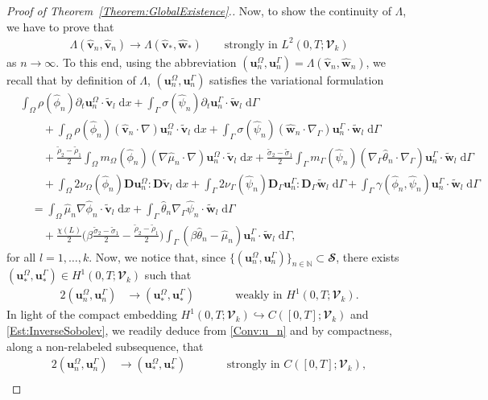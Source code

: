 \documentclass[10pt,reqno]{amsart}
\theoremstyle{remark}
\numberwithin{equation}{section}
\newcommand{\N}{\mathbb N}
\newcommand{\bv}{\mathbf{v}}
\newcommand{\bu}{\mathbf{u}}
\newcommand{\bw}{\mathbf{w}}
\newcommand{\ww}{\widehat{\bw}}
\newcommand{\wv}{\widehat{\bv}}
\newcommand{\tv}{\widetilde{\bv}}
\newcommand{\tw}{\widetilde{\bw}}
\newcommand{\wphi}{\widehat{\phi}}
\newcommand{\wpsi}{\widehat{\psi}}
\newcommand{\wmu}{\widehat{\mu}}
\newcommand{\wtheta}{\widehat{\theta}}
\newcommand{\D}{\mathbf{D}}
\newcommand{\Dg}{\mathbf{D}_\Gamma}
\newcommand{\intO}{\int_\Omega}
\newcommand{\intG}{\int_\Gamma}
\newcommand{\dx}{\;\mathrm{d}x}
\newcommand{\dG}{\;\mathrm d\Ga}
\newcommand{\delt}{\partial_{t}}
\newcommand{\Grad}{\nabla}
\newcommand{\Gradg}{\nabla_\Ga}
\newcommand{\emb}{\hookrightarrow}
\newcommand{\Om}{\Omega}
\newcommand{\Ga}{\Gamma}
\begin{document}
\begin{proof}[Proof of Theorem~\ref{Theorem:GlobalExistence}.]
Now, to show the continuity of $\Lambda$, we have to prove that
\begin{align*}
    \Lambda(\wv_n,\wv_n) \rightarrow \Lambda(\wv_\ast,\ww_\ast) \qquad\text{strongly in~} L^2(0,T;\mathbfcal{V}_k)
\end{align*}
as $n\rightarrow\infty$. To this end, using the abbreviation $(\bu^\Om_n,\bu^\Ga_n) = \Lambda(\wv_n,\ww_n)$, we recall that by definition of $\Lambda$, $(\bu^\Om_n,\bu^\Ga_n)$ satisfies the variational formulation
\begin{align}
    &\intO\rho(\wphi_n)\delt\bu^\Om_n\cdot\tv_l\dx + \intG\sigma(\wpsi_n)\delt\bu^\Ga_n\cdot\tw_l\dG \nonumber \\
    &\qquad + \intO\rho(\wphi_n)(\wv_n\cdot\Grad)\bu^\Om_n\cdot\tv_l\dx + \intG\sigma(\wpsi_n)(\ww_n\cdot\Gradg)\bu^\Ga_n\cdot\tw_l\dG \nonumber \\
    &\qquad + \frac{\tilde\rho_2 - \tilde\rho_1}{2}\intO m_\Om(\wphi_n)(\Grad\wmu_n\cdot\Grad)\bu^\Om_n\cdot\tv_l\dx + \frac{\tilde\sigma_2 - \tilde\sigma_1}{2}\intG m_\Ga(\wpsi_n)(\Gradg\wtheta_n\cdot\Gradg)\bu^\Ga_n\cdot\tw_l\dG \label{GalerkinApprox:Continuity} \\
    &\qquad + \intO2\nu_\Om(\wphi_n)\D\bu^\Om_n:\D\tv_l\dx + \intG2\nu_\Ga(\wpsi_n)\Dg\bu^\Ga_n:\Dg\tw_l\dG + \intG \gamma(\wphi_n,\wpsi_n)\bu^\Ga_n\cdot\tw_l\dG  \nonumber \\
    &\quad = \intO\wmu_n\Grad\wphi_n\cdot\tv_l\dx + \intG\wtheta_n\Gradg\wpsi_n\cdot\tw_l\dG \nonumber \\
    &\qquad + \frac{\chi(L)}{2}\Big(\beta\frac{\tilde\sigma_2 - \tilde\sigma_1}{2} - \frac{\tilde\rho_2 - \tilde\rho_1}{2}\big)\intG(\beta\wtheta_n - \wmu_n)\bu^\Ga_n\cdot\tw_l\dG, \nonumber
\end{align}
for all $l=1,\ldots,k$. Now, we notice that, since $\{(\bu^\Om_n,\bu^\Ga_n)\}_{n\in\N}\subset\mathbfcal{S}$, there exists $(\bu^\Om_\ast,\bu^\Ga_\ast)\in H^1(0,T;\mathbfcal{V}_k)$ such that
\begin{alignat}{2}
    (\bu^\Om_n,\bu^\Ga_n) &\rightarrow (\bu^\Om_\ast,\bu^\Ga_\ast) &&\qquad\text{weakly in~} H^1(0,T;\mathbfcal{V}_k). \label{Conv:u_n}
\end{alignat}
In light of the compact embedding $H^1(0,T;\mathbfcal{V}_k)\emb C([0,T];\mathbfcal{V}_k)$ and \eqref{Est:InverseSobolev}, we readily deduce from \eqref{Conv:u_n} and by compactness, along a non-relabeled subsequence, that
\begin{alignat}{2}
        (\bu^\Om_n,\bu^\Ga_n) &\rightarrow (\bu^\Om_\ast,\bu^\Ga_\ast) &&\qquad\text{strongly in~} C([0,T];\mathbfcal{V}_k), \label{Conv:u_n:strong} \\

\end{alignat}
\end{proof}
\end{document}
